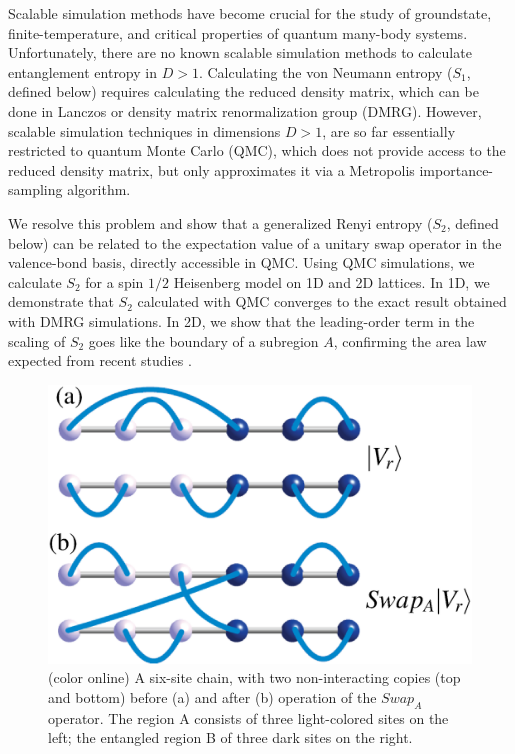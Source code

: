 \documentclass[prl,aps,twocolumn,floatfix,amsmath,amssymb,superscriptaddress,tightenlines]{revtex4}
\begin{document}
Scalable simulation methods have become crucial for the 
study of groundstate, finite-temperature, and critical properties of quantum
many-body systems.
Unfortunately, there are 
no known scalable simulation methods to calculate entanglement entropy in $D>1$.
Calculating the von Neumann entropy ($S_1$, defined below) requires calculating
the reduced density matrix,
which can be done in Lanczos 
or density matrix renormalization group (DMRG).  However, scalable simulation techniques in dimensions $D>1$,
are so far essentially
restricted to quantum Monte Carlo (QMC), which does not provide access to the reduced density matrix, but only approximates it
via a Metropolis importance-sampling algorithm. 


We resolve this problem and show that a generalized Renyi entropy ($S_2$, defined below) can be related to the expectation
value of a unitary swap operator in the valence-bond basis,
directly accessible in QMC.
Using QMC simulations, we calculate $S_2$ for a spin $1/2$ Heisenberg model
on 1D and 2D lattices.  In 1D, we demonstrate that $S_2$ calculated with QMC converges to the exact result obtained with DMRG simulations.  In 2D, we show that the leading-order term in the scaling of $S_2$ goes like the boundary of a subregion $A$, 
confirming the area law expected from recent studies \cite{Ann}.

\begin{figure} {
\includegraphics[width=2.4
in]{swap_2.eps} \caption{(color online) 
\label{swap_2}
A six-site chain, with two non-interacting copies (top and bottom) before (a) and after (b) operation of the $Swap_A$ operator.  
The region A consists of three light-colored sites on the left; the entangled region B of three dark sites on the right.
}
} \end{figure}
\end{document}
